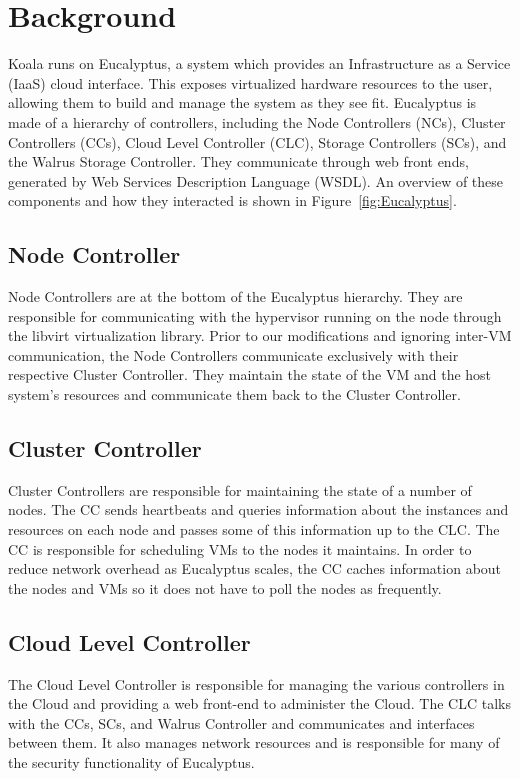 \section{Background}
\label{sec:background}

Koala runs on Eucalyptus, a system which provides an Infrastructure as a
Service (IaaS) cloud interface.  This exposes virtualized hardware resources to
the user, allowing them to build and manage the system as they see fit.
Eucalyptus is made of a hierarchy of controllers, including the Node
Controllers (NCs), Cluster Controllers (CCs), Cloud Level Controller (CLC),
Storage Controllers (SCs), and the Walrus Storage Controller.  They communicate
through web front ends, generated by Web Services Description Language (WSDL).
An overview of these components and how they interacted is shown in
Figure~\ref{fig:Eucalyptus}.


\subsection{Node Controller}
Node Controllers are at the bottom of the Eucalyptus hierarchy.  They are responsible for communicating with the hypervisor running on the node through the libvirt virtualization library.  Prior to our modifications and ignoring inter-VM communication, the Node Controllers communicate exclusively with their respective Cluster Controller.  They maintain the state of the VM and the host system's resources and communicate them back to the Cluster Controller.

\subsection{Cluster Controller}
Cluster Controllers are responsible for maintaining the state of a number of nodes.  The CC sends heartbeats and queries information about the instances and resources on each node and passes some of this information up to the CLC.  The CC is responsible for scheduling VMs to the nodes it maintains.  In order to reduce network overhead as Eucalyptus scales, the CC caches information about the nodes and VMs so it does not have to poll the nodes as frequently.

\subsection{Cloud Level Controller}
The Cloud Level Controller is responsible for managing the various controllers in the Cloud and providing a web front-end to administer the Cloud.  The CLC talks with the CCs, SCs, and Walrus Controller and communicates and interfaces between them.  It also manages network resources and is responsible for many of the security functionality of Eucalyptus.

